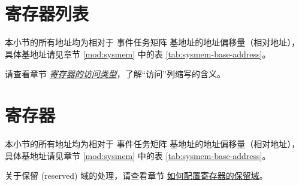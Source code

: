 \documentclass[main\_\_CN.tex]{subfiles}
\begin{document}
\section{寄存器列表}
\label{sec:evntaskmatrix-reg-summ}

本小节的所有地址均为相对于 事件任务矩阵 基地址的地址偏移量（相对地址），具体基地址请见章节 \ref{mod:sysmem} \textit{} 中的表 \ref{tab:sysmem-base-address}。

请查看章节 \hyperref[glossary-access-types]{\textit{寄存器的访问类型}}，了解“访问”列缩写的含义。






\newpage
\section{寄存器}

本小节的所有地址均为相对于 事件任务矩阵 基地址的地址偏移量（相对地址），具体基地址请见章节 \ref{mod:sysmem} \textit{} 中的表 \ref{tab:sysmem-base-address}。

关于保留 (reserved) 域的处理，请查看章节 \hyperref[programming-reserved-field]{如何配置寄存器的保留域}。


\end{document}
